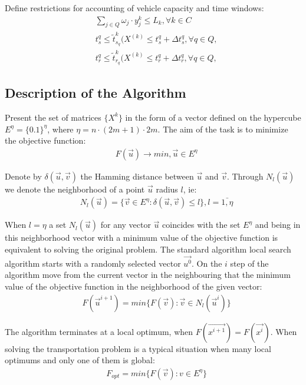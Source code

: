 \documentclass[]{TAACpaper}
\begin{document}
Define restrictions for accounting of vehicle capacity and time windows:
\begin{align} 
& \sum_{j\in{Q}} \omega_j \cdot y_{j}^{k} \leq L_k, \forall{k}\in{C}\\
& t_{s}^{q} \leq \tilde{t}^k_{s_q}(X^{(k)} \leq t_{s}^{q}+ \Delta{t_{s}^{q}}, \forall q \in Q, \label{tws_cond} \\
& t_{r}^{q} \leq \tilde{t}^k_{r_q}(X^{(k)} \leq t_{r}^{q}+ \Delta{t_{r}^{q}}, \forall q \in Q, \label{twr_cond}
\end{align}



\subsection{Description of the Algorithm}
Present the set of matrices $\{X^k\}$ in the form of a vector defined on the hypercube $E^\eta=\{0.1\}^\eta$, where $\eta=n\cdot(2m+1)\cdot 2m$. The aim of the task is to minimize the objective function:
\begin{align} 
& F(\vec{u})\to min,\vec{u}\in E^{\eta}
\end{align}	

Denote by $\delta(\vec{u},\vec{v})$ the Hamming distance between $\vec{u}$ and $\vec{v}$. Through $N_l(\vec{u})$ we denote the neighborhood of a point $\vec{u}$ radius $l$, ie:
\begin{align} 
& N_l(\vec{u})=\{\vec{v} \in E^{\eta}:\delta(\vec{u},\vec{v})\le l \}, l=\bar{1,\eta}
\end{align}	

When $l=\eta$ a set $ N_l(\vec{u})$ for any vector $\vec{u}$ coincides with the set $E^{\eta}$ and being in this neighborhood vector with a minimum value of the objective function is equivalent to solving the original problem. The standard algorithm local search algorithm starts with a randomly selected vector $\vec{u^0}$.
On the $i$ step of the algorithm move from the current vector in the neighbouring that the minimum value of the objective function in the neighborhood of the given vector:
\begin{align} 
& F(\vec{u}^{i+1})=min\{F(\vec{v}):\vec{v} \in N_l(\vec{u}^i)\}
\end{align}	

The algorithm terminates at a local optimum, when $F(\vec{x^{i+1}})=F(\vec{x^i})$. When solving the transportation problem is a typical situation when many local optimums and only one of them is global:
\begin{align} 
& F_{opt}=min\{F(\vec{v}):v \in E^{\eta}\}
\end{align}	
\end{document}
